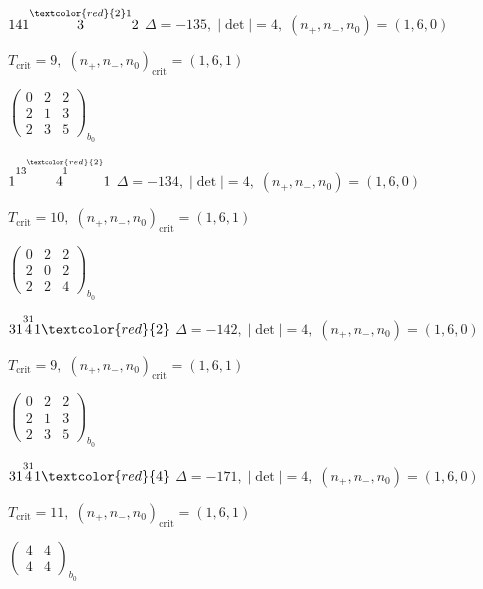 \documentclass[10pt]{article}
\begin{document}
$141\overset{\textcolor{red}{2}1}{3}2$ \quad $\Delta=-135,\; |\det|=4,\; (n_+,n_-,n_0)=(1,6,0)$

\hspace{1em}$T_{\text{crit}}=9,\; (n_+,n_-,n_0)_{\text{crit}}=(1,6,1)$

\hspace{2em}$\left(\begin{smallmatrix}0 & 2 & 2 \\ 2 & 1 & 3 \\ 2 & 3 & 5\end{smallmatrix}\right)_{\!b_0}$

\smallskip

$1\overset{13\overset{\textcolor{red}{2}}{1}}{4}1$ \quad $\Delta=-134,\; |\det|=4,\; (n_+,n_-,n_0)=(1,6,0)$

\hspace{1em}$T_{\text{crit}}=10,\; (n_+,n_-,n_0)_{\text{crit}}=(1,6,1)$

\hspace{2em}$\left(\begin{smallmatrix}0 & 2 & 2 \\ 2 & 0 & 2 \\ 2 & 2 & 4\end{smallmatrix}\right)_{\!b_0}$

\smallskip

$31\overset{31}{4}1\textcolor{red}{2}$ \quad $\Delta=-142,\; |\det|=4,\; (n_+,n_-,n_0)=(1,6,0)$

\hspace{1em}$T_{\text{crit}}=9,\; (n_+,n_-,n_0)_{\text{crit}}=(1,6,1)$

\hspace{2em}$\left(\begin{smallmatrix}0 & 2 & 2 \\ 2 & 1 & 3 \\ 2 & 3 & 5\end{smallmatrix}\right)_{\!b_0}$

$31\overset{31}{4}1\textcolor{red}{4}$ \quad $\Delta=-171,\; |\det|=4,\; (n_+,n_-,n_0)=(1,6,0)$

\hspace{1em}$T_{\text{crit}}=11,\; (n_+,n_-,n_0)_{\text{crit}}=(1,6,1)$

\hspace{2em}$\left(\begin{smallmatrix}4 & 4 \\ 4 & 4\end{smallmatrix}\right)_{\!b_0}$
\end{document}
